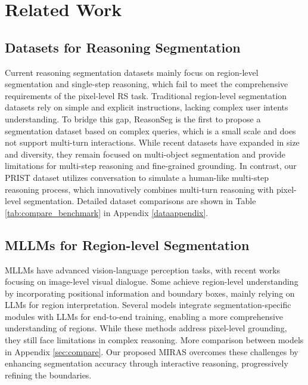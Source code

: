\section{Related Work}
\vspace{-5pt}
\subsection{Datasets for Reasoning Segmentation}
\vspace{-5pt}
Current reasoning segmentation datasets \cite{lai2023lisa,rasheed2024glamm,yuan2024osprey} mainly focus on region-level segmentation and single-step reasoning, which fail to meet the comprehensive requirements of the pixel-level RS task.
Traditional region-level segmentation datasets \cite{yu2016modeling,krishna2017visual} rely on simple and explicit instructions, lacking complex user intents understanding. To bridge this gap, ReasonSeg \cite{lai2023lisa} is the first to propose a segmentation dataset based on complex queries, which is a small scale and does not support multi-turn interactions. While recent datasets \cite{yuan2024osprey,rasheed2024glamm,ren2024pixellm} have expanded in size and diversity, they remain focused on multi-object segmentation and provide limitations for multi-step reasoning and fine-grained grounding. In contrast, our PRIST dataset utilizes conversation to simulate a human-like multi-step reasoning process, which innovatively combines multi-turn reasoning with pixel-level segmentation. %
Detailed dataset comparisons are shown in Table \ref{tab:compare_benchmark} in Appendix \ref{dataappendix}.
\vspace{-5pt}
\subsection{MLLMs for Region-level Segmentation} 
\vspace{-5pt}
MLLMs have advanced vision-language perception tasks, with recent works 
\cite{peng2023kosmos,you2023ferret,zhang2023gpt4roi} focusing on image-level visual dialogue. Some \cite{chen2023shikra,peng2023kosmos,pi2023detgpt} achieve region-level understanding by incorporating positional information and boundary boxes, mainly relying on LLMs for region interpretation. Several models \cite{lai2023lisa,ren2024pixellm,rasheed2024glamm,zhang2024omg} integrate segmentation-specific modules with LLMs for end-to-end training, enabling a more comprehensive understanding of regions. While these methods address pixel-level grounding, they still face limitations in complex reasoning. More comparison between models in Appendix \ref{sec:compare}. Our proposed MIRAS overcomes these challenges by enhancing segmentation accuracy through interactive reasoning, progressively refining the boundaries. 
\vspace{-2pt}